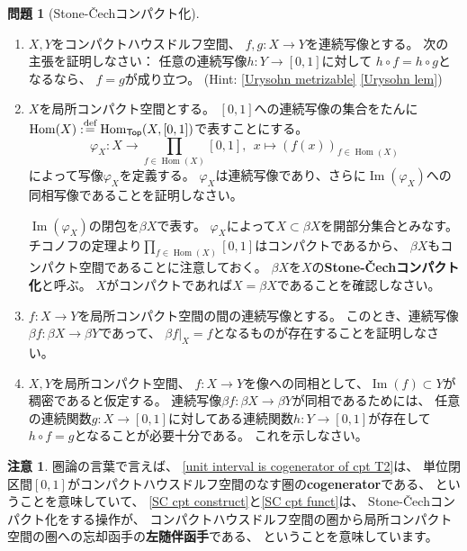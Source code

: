 \documentclass[uplatex]{jsarticle}
\theoremstyle{definition}
\newtheorem{prob}[prob]{問題}
\newtheorem*{rem*}{注意}
\DeclareMathOperator{\Hom}{Hom}
\DeclareMathOperator{\im}{\mathrm{Im}}
\newcommand{\dfn}{:\overset{\mbox{{\scriptsize def}}}{=}}
\begin{document}
\begin{prob}[Stone-\v{C}echコンパクト化]
  \label{SC cpt}
  \
  \begin{enumerate}
    \item \label{unit interval is cogenerator of cpt T2}
    \(X,Y\)をコンパクトハウスドルフ空間、
    \(f,g:X\to Y\)を連続写像とする。
    次の主張を証明しなさい：
    任意の連続写像\(h:Y\to [0,1]\)に対して
    \(h\circ f = h\circ g\)となるなら、
    \(f=g\)が成り立つ。
    (Hint: \autoref{Urysohn metrizable} \ref{Urysohn lem})
    \item \label{SC cpt construct}
    \(X\)を局所コンパクト空間とする。
    \([0,1]\)への連続写像の集合をたんに
    \(\Hom(X)\dfn \Hom_{\mathsf{Top}}(X,[0,1])\)で表すことにする。
    \[
    \varphi_X: X\to \prod_{f\in \Hom(X)} [0,1], \ \ x\mapsto (f(x))_{f\in \Hom(X)}
    \]
    によって写像\(\varphi_X\)を定義する。
    \(\varphi_X\)は連続写像であり、さらに\(\im(\varphi_X)\)への同相写像であることを証明しなさい。

    \(\im(\varphi_X)\)の閉包を\(\beta X\)で表す。
    \(\varphi_X\)によって\(X\subset \beta X\)を開部分集合とみなす。
    チコノフの定理より\(\prod_{f\in \Hom(X)} [0,1]\)はコンパクトであるから、
    \(\beta X\)もコンパクト空間であることに注意しておく。
    \(\beta X\)を\(X\)の\textbf{Stone-\v{C}echコンパクト化}と呼ぶ。
    \(X\)がコンパクトであれば\(X = \beta X\)であることを確認しなさい。
    \item \label{SC cpt funct}
    \(f:X\to Y\)を局所コンパクト空間の間の連続写像とする。
    このとき、連続写像\(\beta f:\beta X \to \beta Y\)であって、
    \(\beta f|_X = f\)となるものが存在することを証明しなさい。
    \item
    \(X,Y\)を局所コンパクト空間、
    \(f:X\to Y\)を像への同相として、\(\im(f)\subset Y\)が稠密であると仮定する。
    連続写像\(\beta f:\beta X \to \beta Y\)が同相であるためには、
    任意の連続関数\(g:X\to [0,1]\)に対してある連続関数\(h:Y\to [0,1]\)が存在して
    \(h\circ f = g\)となることが必要十分である。
    これを示しなさい。
  \end{enumerate}
\end{prob}


\begin{rem*}
  圏論の言葉で言えば、
  \ref{unit interval is cogenerator of cpt T2}は、
  単位閉区間\([0,1]\)がコンパクトハウスドルフ空間のなす圏の\textbf{cogenerator}である、
  ということを意味していて、
  \ref{SC cpt construct}と\ref{SC cpt funct}は、
  Stone-\v{C}echコンパクト化をする操作が、
  コンパクトハウスドルフ空間の圏から局所コンパクト空間の圏への忘却函手の\textbf{左随伴函手}である、
  ということを意味しています。
\end{rem*}
\end{document}
